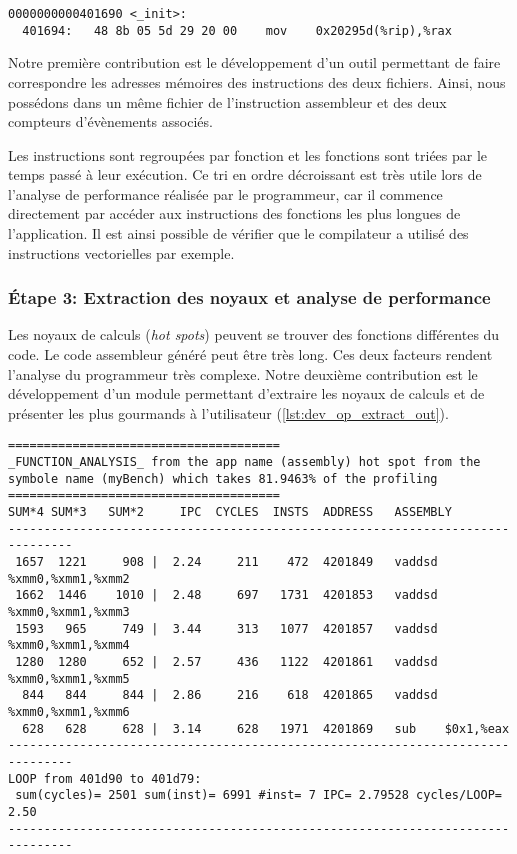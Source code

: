 \begin{lstlisting}[label=lst:dev_op_obj_out, caption=La commande objdump permet de désassembler le fichier binaire de l'application.]
0000000000401690 <_init>:
  401694:	48 8b 05 5d 29 20 00 	mov    0x20295d(%rip),%rax
\end{lstlisting}  

        Notre première contribution est le développement d'un outil permettant de faire correspondre les adresses mémoires des instructions des deux fichiers. Ainsi, nous possédons dans un même fichier de l'instruction assembleur et des deux compteurs d'évènements associés. 
        

        Les instructions sont regroupées par fonction et les fonctions sont triées par le temps passé à leur exécution. Ce tri en ordre décroissant est très utile lors de l'analyse de performance réalisée par le programmeur, car il commence directement par accéder aux instructions des fonctions les plus longues de l'application. Il est ainsi possible de vérifier que le compilateur a utilisé des instructions vectorielles par exemple. 


    \subsubsection{Étape 3: Extraction des noyaux et analyse de performance}
    
        Les noyaux de calculs (\textit{hot spots}) peuvent se trouver des fonctions différentes du code. Le code assembleur généré peut être très long. Ces deux facteurs rendent l'analyse du programmeur très complexe. Notre deuxième contribution est le développement d'un module permettant d'extraire les noyaux de calculs et de présenter les plus gourmands à l'utilisateur (\autoref{lst:dev_op_extract_out}).
      
\begin{lstlisting}[label=lst:dev_op_extract_out, caption=L'outil Oprofile++ permet de faire correspondre les adresses mémoires des deux fichiers.]
======================================
_FUNCTION_ANALYSIS_ from the app name (assembly) hot spot from the symbole name (myBench) which takes 81.9463% of the profiling
======================================
SUM*4 SUM*3   SUM*2     IPC  CYCLES  INSTS  ADDRESS   ASSEMBLY  
-------------------------------------------------------------------------------
 1657  1221     908 |  2.24     211    472  4201849   vaddsd %xmm0,%xmm1,%xmm2
 1662  1446    1010 |  2.48     697   1731  4201853   vaddsd %xmm0,%xmm1,%xmm3
 1593   965     749 |  3.44     313   1077  4201857   vaddsd %xmm0,%xmm1,%xmm4
 1280  1280     652 |  2.57     436   1122  4201861   vaddsd %xmm0,%xmm1,%xmm5
  844   844     844 |  2.86     216    618  4201865   vaddsd %xmm0,%xmm1,%xmm6
  628   628     628 |  3.14     628   1971  4201869   sub    $0x1,%eax
-------------------------------------------------------------------------------
LOOP from 401d90 to 401d79:
 sum(cycles)= 2501 sum(inst)= 6991 #inst= 7 IPC= 2.79528 cycles/LOOP= 2.50
-------------------------------------------------------------------------------
\end{lstlisting} 

